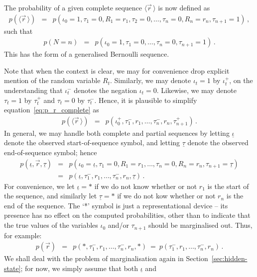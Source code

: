 \documentclass[a4paper]{article}
\newcommand{\ui}{\underline{\iota}}
\newcommand{\ut}{\underline{\tau}}
\begin{document}
The probability of a given complete sequence $\langle\vec{r}\,\rangle$ is now defined as
\begin{eqnarray}
   p(\langle\vec{r}\,\rangle)
& = & p(\iota_0\!=\!1,\tau_1\!=\!0,R_1=r_1,\tau_2\!=\!0,\ldots,\tau_n\!=\!0,R_n=r_n,\tau_{n+1}\!=\!1)
\label{eq:p_r_complete}
\,,
\end{eqnarray}
such that 
\begin{eqnarray}
   p(N\!=\!n) & = &  p(\iota_0\!=\!1,\tau_1\!=\!0,\ldots,\tau_n\!=\!0,\tau_{n+1}\!=\!1)\,.
\end{eqnarray}
This has the form of a generalised Bernoulli sequence.

Note that when the context is clear, we may for convenience drop explicit mention of the random variable $R_t$.
Similarly, we may denote $\iota_t=1$ by $\iota^+_t$, on the understanding that $\iota^-_t$ denotes the negation $\iota_t=0$.
Likewise, we may denote $\tau_t=1$ by $\tau^+_t$ and $\tau_t=0$ by $\tau^-_t$.
Hence, it is plausible to simplify equation~\eqref{eq:p_r_complete} as
\begin{eqnarray}
p(\langle\vec{r}\,\rangle) 
& = & p(\iota_0^+,\tau^-_1,r_1,\ldots,\tau^-_n,r_n,\tau^+_{n+1})\,.
\end{eqnarray}
In general, we may handle both complete and partial sequences by letting $\ui$ denote the observed start-of-sequence symbol, and
letting $\ut$ denote the observed end-of-sequence symbol; hence
\begin{eqnarray}
p(\ui,\vec{r},\ut)
& = & p(\iota_0\!=\!\ui,\tau_1\!=\!0,R_1\!=\!r_1,\ldots,\tau_n\!=\!0,R_n\!=\!r_n,\tau_{n+1}\!=\!\ut)
\nonumber\\
& = & p(\ui,\tau^-_1,r_1,\ldots,\tau^-_n,r_n,\ut)\,.
\label{eq:pr:gen}
\end{eqnarray}
For convenience, we let $\ui=*$ if we do not know whether or not $r_1$ is the start of the sequence,
and similarly let $\ut=*$ if we do not kow whether or not $r_n$ is the end of the sequence.
The `*' symbol is just a representational device -- its presence has no effect on the computed probabilities, other than to indicate that the true values
of the variables $\iota_0$ and/or $\tau_{n+1}$ should be marginalised out. Thus, for example:
\begin{eqnarray}
p(\vec{r}) 
& = & p(*,\tau^-_1,r_1,\ldots,\tau^-_n,r_n,*)~=~p(\tau^-_1,r_1,\ldots,\tau^-_n,r_n)\,.
\end{eqnarray}
We shall deal with the problem of marginalisation again in Section~\ref{sec:hidden-state}; for now, we simply assume that both $\ui$ and
\end{document}
